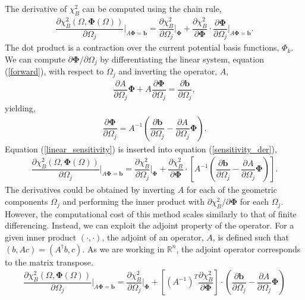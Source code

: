 \documentclass[aps,unsortedaddress]{revtex4-1}
\newcommand{\partder}[2]{\dfrac{\partial  #1}{\partial  #2}}
\begin{document}
The derivative of $\chi^2_B$ can be computed using the chain rule, 
\begin{gather}
\partder{\chi^2_B(\Omega, \bm{\Phi}(\Omega))}{\Omega_j} \bigg \rvert_{A \bm{\Phi} = \bm{b}} = \partder{\chi^2_B}{\Omega_j} \bigg \rvert_{\bm{\Phi}} + \partder{\chi^2_B}{\bm{\Phi}} \cdot \partder{\bm{\Phi}}{\Omega_j} \bigg \rvert_{A \bm{\Phi} = \bm{b}}.
\label{sensitivity_der}
\end{gather}
The dot product is a contraction over the current potential basis functions, $\Phi_k$. We can compute $\partial \bm{\Phi}/ \partial \Omega_j$ by differentiating the linear system, equation (\ref{forward}), with respect to $\Omega_j$ and inverting the operator, $A$,
\begin{gather}
\partder{A}{\Omega_j} \bm{\Phi} + A \partder{\bm{\Phi}}{\Omega_j} = \partder{\bm{b}}{\Omega_j},
\end{gather}
yielding,
\begin{gather}
\partder{\bm{\Phi}}{\Omega_j} = A^{-1} \left( \partder{\bm{b}}{\Omega_j} - \partder{A}{\Omega_j} \bm{\Phi} \right).
\label{linear_sensitivity}
\end{gather}
Equation (\ref{linear_sensitivity}) is inserted into equation (\ref{sensitivity_der}),
\begin{gather}
\partder{\chi^2_B(\Omega, \bm{\Phi}(\Omega))}{\Omega_j} \bigg \rvert_{A \bm{\Phi} = \bm{b}} = \partder{\chi^2_B}{\Omega_j} \bigg \rvert_{\bm{\Phi}} + \partder{\chi^2_B}{\bm{\Phi}} \cdot \left[ A^{-1} \left( \partder{\bm{b}}{\Omega_j} - \partder{A}{\Omega_j} \bm{\Phi} \right) \right].
\end{gather}
The derivatives could be obtained by inverting $A$ for each of the geometric components $\Omega_j$ and performing the inner product with $\partial \chi^2_B/ \partial \bm{\Phi}$ for each $\Omega_j$. However, the computational cost of this method scales similarly to that of finite differencing. Instead, we can exploit the adjoint property of the operator. For a given inner product $(\cdot,\cdot)$, the adjoint of an operator, $A$, is defined such that $(b,Ac) = (A^{\dagger} b, c)$. As we are working in $\mathbb{R}^n$, the adjoint operator corresponds to the matrix transpose. 
\begin{gather}
\partder{\chi^2_B(\Omega, \bm{\Phi}(\Omega))}{\Omega_j} \bigg \rvert_{A \bm{\Phi} = \bm{b}} = \partder{\chi^2_B}{\Omega_j} \bigg \rvert_{\bm{\Phi}} + \left[ \left(A^{-1}\right)^{T} \partder{\chi^2_B}{\bm{\Phi}}\right] \cdot \left( \partder{\bm{b}}{\Omega_j} - \partder{A}{\Omega_j} \bm{\Phi} \right)
\end{gather}
\end{document}
